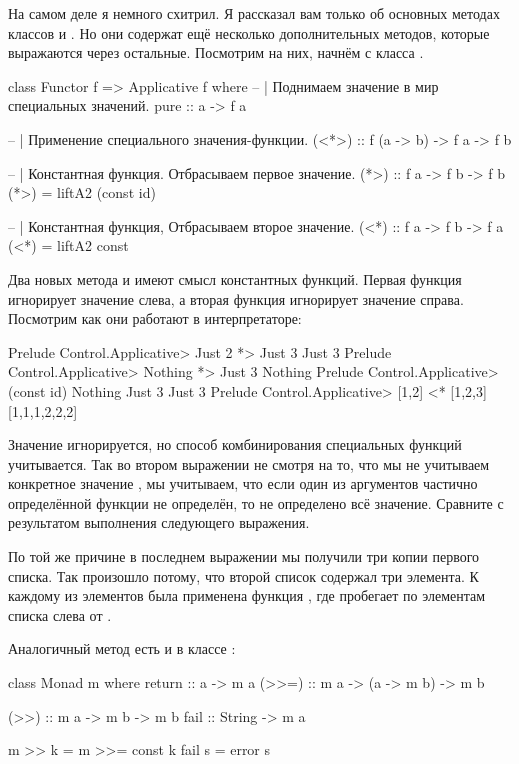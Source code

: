 На самом деле я немного схитрил. Я рассказал вам только
об основных методах классов  и .
Но они содержат ещё несколько дополнительных методов,
которые выражаются через остальные. Посмотрим на них, 
начнём с класса .

\begin{code}
class Functor f => Applicative f where
        -- | Поднимаем значение в мир специальных значений.
        pure :: a -> f a

        -- | Применение специального значения-функции.
        (<*>) :: f (a -> b) -> f a -> f b

        -- | Константная функция. Отбрасываем первое значение.
        (*>) :: f a -> f b -> f b
        (*>) = liftA2 (const id)
        
        -- | Константная функция, Отбрасываем второе значение.
        (<*) :: f a -> f b -> f a
        (<*) = liftA2 const
\end{code}

Два новых метода \In{(*>)} и \In{(<*)} имеют смысл
константных функций. Первая функция игнорирует значение слева,
а вторая функция игнорирует значение справа. 
Посмотрим как они работают в интерпретаторе:

\begin{code}
Prelude Control.Applicative> Just 2 *> Just 3
Just 3
Prelude Control.Applicative> Nothing *> Just 3
Nothing
Prelude Control.Applicative> (const id) Nothing  Just 3
Just 3
Prelude Control.Applicative> [1,2] <* [1,2,3]
[1,1,1,2,2,2]
\end{code}

Значение игнорируется, но способ комбинирования специальных
функций учитывается. Так во втором выражении не смотря на 
то, что мы не учитываем конкретное значение ,
мы учитываем, что если один из аргументов частично определённой
функции не определён, то не определено всё значение. 
Сравните с результатом выполнения следующего выражения. 

По той же причине в последнем выражении мы получили три
копии первого списка. Так произошло потому, что второй
список содержал три элемента. К каждому из элементов
была применена функция , где  пробегает
по элементам списка слева от \In{(<*)}.

Аналогичный метод есть и в классе :

\begin{code}
class  Monad m  where
    return  :: a -> m a
    (>>=)   :: m a -> (a -> m b) -> m b
    
    (>>)    :: m a -> m b -> m b
    fail    :: String -> m a

    m >> k  = m >>= const k
    fail s  = error s
\end{code}

